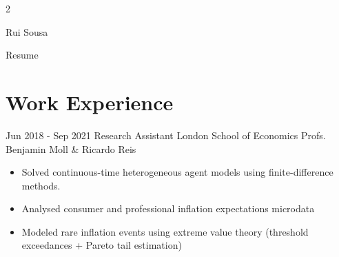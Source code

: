 \documentclass[
	10pt, %
]{FreemanCV}
\begin{document}
\begin{paracol}{2} %


\parbox[][0.11\textheight][c]{\linewidth}{ %
	\centering %
	
	{\sffamily\Huge Rui Sousa} %
	
	\medskip %
	
	{\cursivefont\Huge\textcolor{headings}{Resume}}
	
	\vfill %
}



\section{Work Experience}





\jobentry
	{Jun 2018 - Sep 2021} %
	{Research Assistant} %
	{London School of Economics} %
	{Profs. Benjamin Moll \& Ricardo Reis} %
	{		\begin{itemize}
			\item Solved continuous-time heterogeneous agent models using finite-difference methods.
			\item Analysed consumer and professional inflation expectations microdata
			\item Modeled rare inflation events using extreme value theory (threshold exceedances + Pareto tail estimation)
		\end{itemize}} %


\end{paracol}
\end{document}
